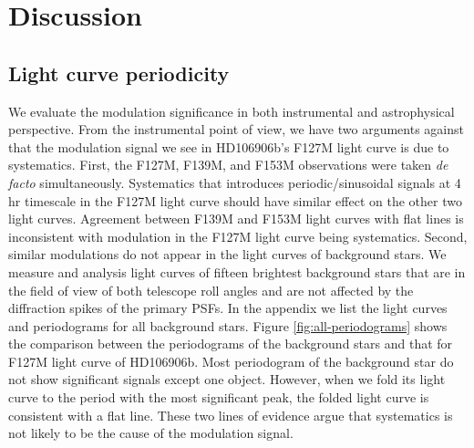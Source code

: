 \documentclass[twocolumn]{aastex62}
\begin{document}


\section{Discussion}
\subsection{Light curve periodicity}

We evaluate the modulation significance in both instrumental and astrophysical perspective. From the instrumental point of view, we have two arguments against that the modulation signal we see in HD106906b's F127M light curve is due to systematics. First, the F127M, F139M, and F153M observations were taken \emph{de facto} simultaneously. Systematics that introduces periodic/sinusoidal signals at 4 hr timescale in the F127M light curve should have similar effect on the other two light curves. Agreement between F139M and F153M light curves with flat lines is inconsistent with modulation in the F127M light curve being systematics. Second, similar modulations do not appear in the light curves of background stars. We measure and analysis light curves of fifteen brightest background stars that are in the field of view of both telescope roll angles and are not affected by the diffraction spikes of the primary PSFs. In the appendix we list the light curves and periodograms for all background stars. Figure \ref{fig:all-periodograms} shows the comparison between the periodograms of the background stars and that for F127M light curve of HD106906b. Most periodogram of the background star do not show significant signals except one object. However, when we fold its light curve to the period with the most significant peak, the folded light curve is consistent with a flat line. These two lines of evidence argue that systematics is not likely to be the cause of the modulation signal.
\end{document}
